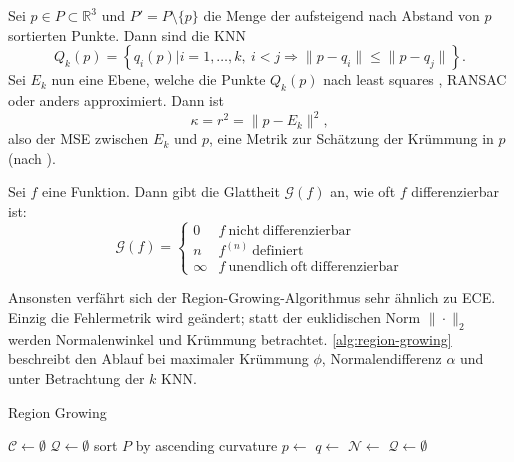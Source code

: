 \begin{definition}
Sei $p \in P \subset \mathbb{R}^3$ und $P' = P \setminus \{p\}$ die Menge der aufsteigend nach Abstand von $p$ sortierten Punkte.
Dann sind die \acl{KNN}
$$
Q_k(p) = \left\{ q_i(p) | i = 1, \dots, k,\ i < j \Rightarrow \|p - q_i\| \leq \|p - q_j\| \right\}.
$$
Sei $E_k$ nun eine Ebene, welche die Punkte $Q_k(p)$ nach least squares \cite{schomaker1959fit}, RANSAC \cite{fischler1981random} oder anders approximiert.
Dann ist
\begin{equation}
\label{eq:kruemmung}
\kappa = r^2 = \|p - E_k\|^2,
\end{equation}
also der \ac{MSE} zwischen $E_k$ und $p$, eine Metrik zur Schätzung der Krümmung in $p$ (nach \cite[Abs. 2.1.2]{rabbani2006segmentation}).
\end{definition}

\begin{definition}
\label{def:glattheit}
Sei $f$ eine Funktion.
Dann gibt die Glattheit $\mathcal{G}(f)$ an, wie oft $f$ differenzierbar ist:
\begin{equation}
\mathcal{G}(f) = \left\{\begin{array}{ll}
0 & f\ \mathrm{nicht\ differenzierbar}\\
n & f^{(n)}\ \mathrm{definiert}\\
\infty & f\ \mathrm{unendlich\ oft\ differenzierbar}
\end{array}\right.
\end{equation}
\end{definition}

Ansonsten verfährt sich der Region-Growing-Algorithmus sehr ähnlich zu \ac{ECE}.
Einzig die Fehlermetrik wird geändert; statt der euklidischen Norm $\|\cdot\|_2$ werden Normalenwinkel und Krümmung betrachtet.
\autoref{alg:region-growing} beschreibt den Ablauf bei maximaler Krümmung $\phi$, Normalendifferenz $\alpha$ und unter Betrachtung der $k$ \ac{KNN}.

\begin{algorithm}[H]
\caption{Region Growing}
\label{alg:region-growing}
\begin{algorithmic}
\State $\mathcal{C} \gets \emptyset$
\State $\mathcal{Q} \gets \emptyset$
\State sort $P$ by ascending curvature
	\State $p \gets$ 
	\State {}
		\State $q \gets$ 
		\State $\mathcal{N} \gets$ 
				\State {}
				\State {}
			\EndIf
		\EndFor
	\EndWhile
	\State {}
	\State $\mathcal{Q} \gets \emptyset$
\EndWhile
\State {}
\end{algorithmic}
\end{algorithm}


